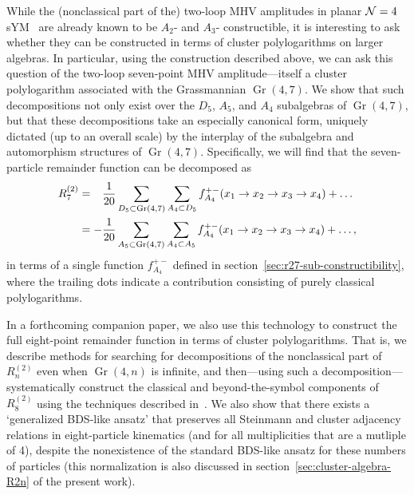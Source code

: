 \documentclass[12pt]{article}
\DeclareMathOperator{\Gr}{Gr}
\begin{document}
While the (nonclassical part of the) two-loop MHV amplitudes in planar ${\cal N} =4$ sYM~\cite{Golden:2014xqa} are already known to be $A_2$- and $A_3$- constructible, it is interesting to ask whether they can be constructed in terms of cluster polylogarithms on larger algebras. In particular, using the construction described above, we can ask this question of the two-loop seven-point MHV amplitude---itself a cluster polylogarithm associated with the Grassmannian $\Gr(4,7)$. We show that such decompositions not only exist over the $D_5$, $A_5$, and $A_4$ subalgebras of $\Gr(4,7)$, but that these decompositions take an especially canonical form, uniquely dictated (up to an overall scale) by the interplay of the subalgebra and automorphism structures of $\Gr(4,7)$. Specifically, we will find that the seven-particle remainder function can be decomposed as
\begin{align}
	R^{(2)}_7 &=  {\color{white} - } \frac{1}{20} \sum_{D_5\subset \Gr(4,7)} \sum_{A_4\subset D_5} f_{A_4}^{+-}(x_1\to x_2 \to x_3 \to x_4) + \dots \nonumber \\
	& = - \frac{1}{20}  \sum_{A_5\subset \Gr(4,7)} \sum_{A_4\subset A_5} f_{A_4}^{+-}(x_1\to x_2 \to x_3 \to x_4) + \dots, \nonumber
\end{align}
in terms of a single function $f_{A_4}^{+-}$ defined in section~\ref{sec:r27-sub-constructibility}, where the trailing dots indicate a contribution consisting of purely classical polylogarithms. 

In a forthcoming companion paper, we also use this technology to construct the full eight-point remainder function in terms of cluster polylogarithms. That is, we describe methods for searching for decompositions of the nonclassical part of $R_n^{(2)}$ even when $\Gr(4,n)$ is infinite, and then---using such a decomposition---systematically construct the classical and beyond-the-symbol components of $R_8^{(2)}$ using the techniques described in~\cite{Golden:2014xqf}. We also show that there exists a `generalized BDS-like ansatz' that preserves all Steinmann and cluster adjacency relations in eight-particle kinematics (and for all multiplicities that are a mutliple of 4), despite the nonexistence of the standard BDS-like ansatz for these numbers of particles (this normalization is also discussed in section~\ref{sec:cluster-algebra-R2n} of the present work).
\end{document}
